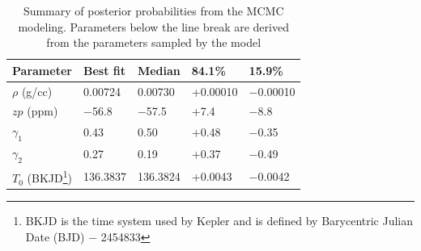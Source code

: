 \documentclass[apjl]{emulateapj}
\begin{document}
\begin{table}
\caption{Summary of posterior probabilities from the MCMC modeling. Parameters below the line break are derived from the parameters sampled by the model}\label{tab:results}
\begin{tabular}{l l l l l}
Parameter&Best fit& Median&84.1\%&15.9\%\\
\hline
%
$\rho$ (g/cc)			&	0.00724		&	0.00730		&	+0.00010		&	$-$0.00010	\\
$zp$	(ppm)			&	$-$56.8		&	$-$57.5		&	+7.4			&	$-$8.8		\\
$\gamma_1$			&	0.43			&	0.50			&	+0.48		&	$-$0.35		\\
$\gamma_2$			&	0.27			&	0.19			&	+0.37		&	$-$0.49		\\
$T_0$ (BKJD\footnote{BKJD is the time system used by Kepler and is defined by Barycentric Julian Date (BJD) $-$ 2454833}) 	&	136.3837		&	136.3824		&	+0.0043		&	$-$0.0042		\\

\end{tabular}
\end{table}
\end{document}
